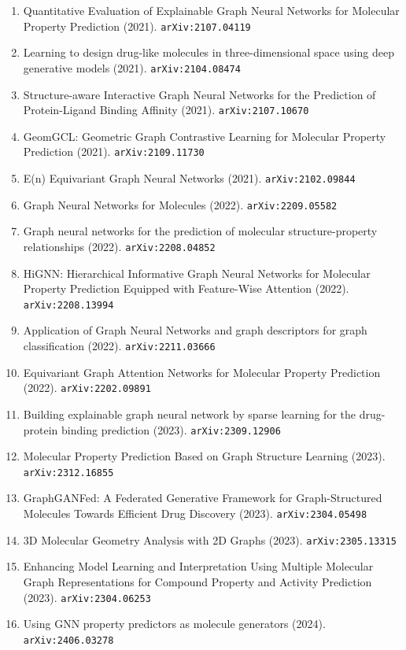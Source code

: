 \documentclass[11pt]{article}
\begin{document}
\begin{enumerate}
  \item Quantitative Evaluation of Explainable Graph Neural Networks for
  Molecular Property Prediction (2021). \texttt{arXiv:2107.04119}
  \item Learning to design drug-like molecules in three-dimensional space using
  deep generative models (2021). \texttt{arXiv:2104.08474}
  \item Structure-aware Interactive Graph Neural Networks for the Prediction of
  Protein-Ligand Binding Affinity (2021). \texttt{arXiv:2107.10670}
  \item GeomGCL: Geometric Graph Contrastive Learning for Molecular Property
  Prediction (2021). \texttt{arXiv:2109.11730}
  \item E(n) Equivariant Graph Neural Networks (2021). \texttt{arXiv:2102.09844}
  \item Graph Neural Networks for Molecules (2022). \texttt{arXiv:2209.05582}
  \item Graph neural networks for the prediction of molecular structure-property
  relationships (2022). \texttt{arXiv:2208.04852}
  \item HiGNN: Hierarchical Informative Graph Neural Networks for Molecular
  Property Prediction Equipped with Feature-Wise Attention (2022). \texttt{arXiv:2208.13994}
  \item Application of Graph Neural Networks and graph descriptors for graph
  classification (2022). \texttt{arXiv:2211.03666}
  \item Equivariant Graph Attention Networks for Molecular Property Prediction (2022). \texttt{arXiv:2202.09891}
  \item Building explainable graph neural network by sparse learning for the
  drug-protein binding prediction (2023). \texttt{arXiv:2309.12906}
  \item Molecular Property Prediction Based on Graph Structure Learning (2023). \texttt{arXiv:2312.16855}
  \item GraphGANFed: A Federated Generative Framework for Graph-Structured
  Molecules Towards Efficient Drug Discovery (2023). \texttt{arXiv:2304.05498}
  \item 3D Molecular Geometry Analysis with 2D Graphs (2023). \texttt{arXiv:2305.13315}
  \item Enhancing Model Learning and Interpretation Using Multiple Molecular
  Graph Representations for Compound Property and Activity Prediction (2023). \texttt{arXiv:2304.06253}
  \item Using GNN property predictors as molecule generators (2024). \texttt{arXiv:2406.03278}

\end{enumerate}
\end{document}
